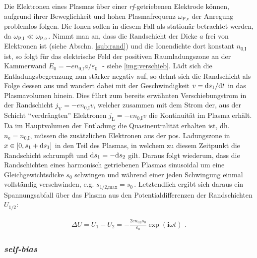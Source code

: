 \documentclass[numbers=noenddot,a4paper]{scrartcl}
\newcommand{\diff}{\textnormal{d}}
\newcommand{\ix}[1]{_\text{#1}}
\newcommand{\imag}{\mathbf{i}}
\newcommand{\tilt}[1]{\textit{#1}}
\begin{document}
				Die Elektronen eines Plasmas über einer \tilt{rf}-getriebenen Elektrode können, aufgrund ihrer Beweglichkeit und hohen Plasmafrequenz $\omega\ix{P,e}$ der Anregung problemlos folgen. Die Ionen sollen in diesem Fall als stationär betrachtet werden, da $\omega\ix{P,I}\ll\omega\ix{P,e}\,$. Nimmt man an, dass die Randschicht der Dicke $a$ frei von Elektronen ist (siehe Abschn. \ref{sub:rand}) und die Ionendichte dort konstant $n\ix{0,I}$ ist, so folgt für das elektrische Feld der positiven Raumladungszone an der Kammerwand $E\ix{0}=-en\ix{0,I}a/\varepsilon\ix{0}\,\,$ - siehe \ref{img:verschieb}. Lädt sich die Entladungsbegrenzung nun stärker negativ auf, so dehnt sich die Randschicht als Folge dessen aus und wandert dabei mit der Geschwindigkeit $v=\diff s\ix{1}/\diff t$ in das Plasmavolumen hinein. Dies führt zum bereits erwähnten Verschiebungstrom in der Randschicht $j\ix{V}=-en\ix{0,I}v$, welcher zusammen mit dem Strom der, aus der Schicht "`verdrängten"' Elektronen $j\ix{L}=-en\ix{0,I}v$ die Kontinuität im Plasma erhält.\\
				Da im Hauptvolumen der Entladung die Quasineutralität erhalten ist, dh. $n\ix{e}=n\ix{0,I}$, müssen die zusätzlichen Elektronen aus der pos. Ladungszone in $x\in\left[0,s\ix{1}+\diff s\ix{1}\right]$ in den Teil des Plasmas, in welchem zu diesem Zeitpunkt die Randschicht schrumpft und $\diff s\ix{1}=-\diff s\ix{2}$ gilt. Daraus folgt wiederum, dass die Randschichten eines harmonisch getriebenen Plasmas sinusoidal um eine Gleichgewichtsdicke $s\ix{0}$ schwingen und während einer jeden Schwingung einmal vollständig verschwinden, e.g. $s\ix{1/2,max}=s\ix{0}\,$.  Letztendlich ergibt sich daraus ein Spannungsabfall über das Plasma aus den Potentialdifferenzen der Randschichten $U\ix{1/2}$:

					\begin{align}
						\Delta U=U\ix{1}-U\ix{2}=-\frac{2en\ix{0,I}s\ix{0}}{\varepsilon\ix{0}}\exp\left(\imag\omega t\right)\,\,.
					\end{align}

				\subsubsection{\tilt{self-bias}}  \label{subsub:self-bias}
\end{document}
